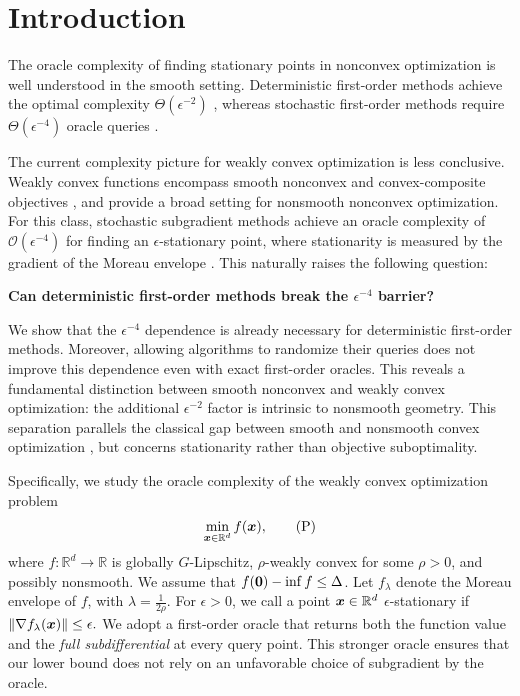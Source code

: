 \section{Introduction} 
\label{sec:introduction}
The oracle complexity of finding stationary points in nonconvex
optimization is well understood in the smooth setting.
Deterministic first-order methods achieve the optimal complexity
$\Theta(\epsilon^{-2})$ \citep{CarmonEtAl2021,carmon2020lower},
whereas stochastic first-order methods require
$\Theta(\epsilon^{-4})$ oracle queries
\citep{arjevani2023lower,ghadimi2013stochastic}.

The current complexity picture for weakly convex optimization is less conclusive. Weakly convex functions encompass smooth nonconvex and convex-composite objectives
\citep{vial1983strong,drusvyatskiy2019efficiency}, and provide a broad setting for nonsmooth nonconvex optimization.
For this class, stochastic subgradient methods achieve an oracle
complexity of $\mathcal O(\epsilon^{-4})$ for finding an
$\epsilon$-stationary point, where stationarity is measured by
the gradient of the Moreau envelope
\citep{DavisDrusvyatskiy2019,davis2019proximally,davis2018stochastic}.
This naturally raises the following question:
\begin{center}
    \bf Can deterministic first-order methods break the $\epsilon^{-4}$ barrier?
\end{center}
We show that the $\epsilon^{-4}$ dependence is already necessary
for deterministic first-order methods.
Moreover, allowing algorithms to randomize their queries does
not improve this dependence even with exact first-order oracles.
This reveals a fundamental distinction between smooth nonconvex
and  weakly convex optimization: the additional
$\epsilon^{-2}$ factor is intrinsic to nonsmooth geometry. This separation parallels the classical gap between smooth and
nonsmooth convex optimization
\citep{nesterov2013introductory,bubeck2015convex},
but concerns stationarity rather than objective suboptimality. 

Specifically, we study the oracle complexity of the weakly convex
optimization problem
\begin{equation}
\label{eq:prob}
\min_{\bm{x}\in\mathbb R^d} f(\bm{x}),
\tag{P}
\end{equation} 
where \(f:\mathbb R^d\to\mathbb R\) is globally \(G\)-Lipschitz,
\(\rho\)-weakly convex for some \(\rho>0\), and possibly nonsmooth. We assume that \(f({\mathbf 0})-\inf f\le\Delta\).
Let \(f_\lambda\) denote the Moreau envelope of \(f\), with
\(\lambda=\tfrac{1}{2\rho}\).
For \(\epsilon>0\), we call a point \(\bm{x}\in\mathbb R^d\)
\(\epsilon\)-stationary if
$
\|\nabla f_\lambda(\bm{x})\|\le\epsilon.
$ 
We adopt a first-order oracle that returns both the function value
and the \emph{full subdifferential} at every query point.
This stronger oracle ensures that our lower bound does not rely
on an unfavorable choice of subgradient by the oracle. 

